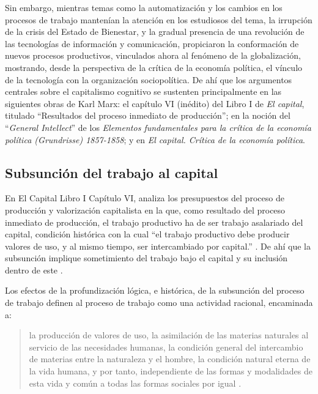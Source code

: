 \documentclass[
  spanish,
  11pt,
  a4paper,
]{scrbook}
\begin{document}
Sin embargo, mientras temas como la automatización y los cambios en los
procesos de trabajo mantenían la atención en los estudiosos del tema, la
irrupción de la crisis del Estado de Bienestar, y la gradual presencia
de una revolución de las tecnologías de información y comunicación,
propiciaron la conformación de nuevos procesos productivos, vinculados
ahora al fenómeno de la globalización, mostrando, desde la perspectiva
de la crítica de la economía política, el vínculo de la tecnología con
la organización sociopolítica. De ahí que los argumentos centrales sobre
el capitalismo cognitivo se sustenten principalmente en las siguientes
obras de Karl Marx: el capítulo VI (inédito) del Libro I de \emph{El
capital}, titulado ``Resultados del proceso inmediato de producción'';
en la noción del ``\emph{General Intellect}'' de los \emph{Elementos
fundamentales para la crítica de la economía política (Grundrisse)
1857-1858}; y en \emph{El capital. Crítica de la economía política}.

\subsection*{Subsunción del trabajo al
capital}\label{subsunciuxf3n-del-trabajo-al-capital}

En El Capital Libro I Capítulo VI, \textcite{Marx2009inedito} analiza
los presupuestos del proceso de producción y valorización capitalista en
la que, como resultado del proceso inmediato de producción, el trabajo
productivo ha de ser trabajo asalariado del capital, condición histórica
con la cual ``el trabajo productivo debe producir valores de uso, y al
mismo tiempo, ser intercambiado por capital.''
\autocite[11]{Carcanholo2013}. De ahí que la subsunción implique
sometimiento del trabajo bajo el capital y su inclusión dentro de este
\autocite[XV]{Marx2009inedito}.

Los efectos de la profundización lógica, e histórica, de la subsunción
del proceso de trabajo definen al proceso de trabajo como una actividad
racional, encaminada a:

\begin{quote}
la producción de valores de uso, la asimilación de las materias
naturales al servicio de las necesidades humanas, la condición general
del intercambio de materias entre la naturaleza y el hombre, la
condición natural eterna de la vida humana, y por tanto, independiente
de las formas y modalidades de esta vida y común a todas las formas
sociales por igual \autocite[136]{Marx2009tomo1}.
\end{quote}
\end{document}
